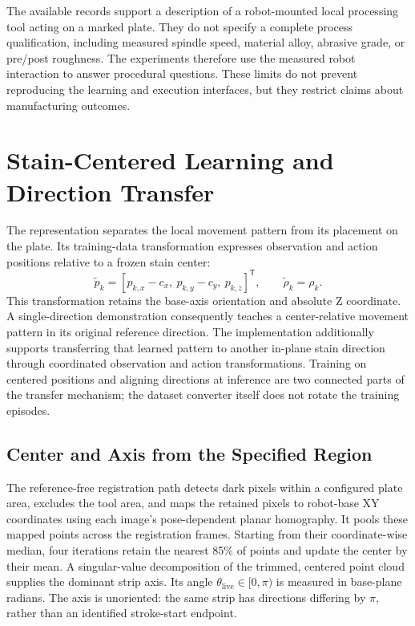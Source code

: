 The available records support a description of a robot-mounted local processing tool acting on a marked plate. They do not specify a complete process qualification, including measured spindle speed, material alloy, abrasive grade, or pre/post roughness. The experiments therefore use the measured robot interaction to answer procedural questions. These limits do not prevent reproducing the learning and execution interfaces, but they restrict claims about manufacturing outcomes.

\section{Stain-Centered Learning and Direction Transfer}
\label{sec:stain_relative_generalization}
The representation separates the local movement pattern from its placement on the plate. Its training-data transformation expresses observation and action positions relative to a frozen stain center:
\begin{equation}
 \widetilde p_k=[p_{k,x}-c_x,\ p_{k,y}-c_y,\ p_{k,z}]^\mathsf{T},
 \qquad \widetilde\rho_k=\rho_k.
 \label{eq:relative_task_pose}
\end{equation}
This transformation retains the base-axis orientation and absolute Z coordinate. A single-direction demonstration consequently teaches a center-relative movement pattern in its original reference direction. The implementation additionally supports transferring that learned pattern to another in-plane stain direction through coordinated observation and action transformations. Training on centered positions and aligning directions at inference are two connected parts of the transfer mechanism; the dataset converter itself does not rotate the training episodes.

\subsection{Center and Axis from the Specified Region}
The reference-free registration path detects dark pixels within a configured plate area, excludes the tool area, and maps the retained pixels to robot-base XY coordinates using each image's pose-dependent planar homography. It pools these mapped points across the registration frames. Starting from their coordinate-wise median, four iterations retain the nearest 85\% of points and update the center by their mean. A singular-value decomposition of the trimmed, centered point cloud supplies the dominant strip axis. Its angle \(\theta_{\mathrm{live}}\in[0,\pi)\) is measured in base-plane radians. The axis is unoriented: the same strip has directions differing by \(\pi\), rather than an identified stroke-start endpoint.

